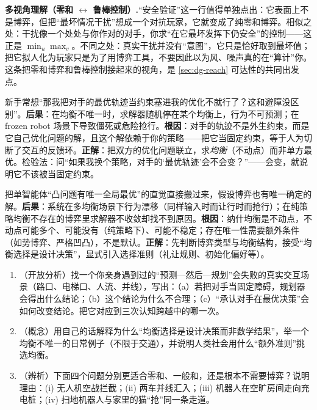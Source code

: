 \begin{note}
\textbf{多视角理解（零和 $\leftrightarrow$ 鲁棒控制）.}\;“安全验证”这一行值得单独点出：它表面上不是博弈，但把“最坏情况干扰”想成一个对抗玩家，它就变成了纯零和博弈。相似之处：干扰像一个处处与你作对的对手，你求“在它最坏发挥下仍安全”的控制——这正是 $\min_u\max_v$。不同之处：真实干扰并没有“意图”，它只是恰好取到最坏值；把它拟人化为玩家只是为了用博弈工具，不要因此以为风、噪声真的在“算计”你。这条把零和博弈和鲁棒控制接起来的视角，是 \cref{sec:dg-reach} 可达性的共同出发点。
\end{note}

\begin{pitfall}
新手常想“那我把对手的最优轨迹当约束塞进我的优化不就行了？这和避障没区别”。\textbf{后果}：在均衡不唯一时，求解器随机停在某个均衡上，行为不可预测；在 frozen robot 场景下导致僵死或危险抢行。\textbf{根因}：对手的轨迹不是外生约束，而是它自己优化问题的解，且这个解依赖于你的策略——把它当固定约束，等于人为切断了交互的反馈环。\textbf{正解}：把双方的优化问题联立，求\emph{均衡}（不动点）而非单方最优。检验法：问“如果我换个策略，对手的‘最优轨迹’会不会变？”——会变，就说明它不该被当固定约束。
\end{pitfall}

\begin{pitfall}
把单智能体“凸问题有唯一全局最优”的直觉直接搬过来，假设博弈也有唯一确定的解。\textbf{后果}：系统在多均衡场景下行为漂移（同样输入时而让行时而抢行）；在纯策略均衡不存在的博弈里求解器不收敛却找不到原因。\textbf{根因}：纳什均衡是不动点，不动点可能多个、可能没有（纯策略下）、可能不稳定；存在唯一性需要额外条件（如势博弈、严格凹凸），不是默认。\textbf{正解}：先判断博弈类型与均衡结构，接受“均衡选择是设计决策”，显式引入选择准则（礼让规则、初始化偏好等）。
\end{pitfall}

\begin{practice}
\begin{enumerate}
  \item （开放分析）找一个你亲身遇到过的“预测—然后—规划”会失败的真实交互场景（路口、电梯口、人流、并线），写出：（a）若把对手当固定障碍，规划器会得出什么结论；（b）这个结论为什么不合理；（c）“承认对手在最优决策”会如何改变结论。把它对应到三次认知跨越中的哪一次。
  \item （概念）用自己的话解释为什么“均衡选择是设计决策而非数学结果”，举一个均衡不唯一的日常例子（不限于交通），并说明人类社会用什么“额外准则”挑选均衡。
  \item （辨析）下面四个问题分别更适合零和、一般和，还是根本不需要博弈？说明理由：(i) 无人机空战拦截；(ii) 两车并线汇入；(iii) 机器人在空旷房间走向充电桩；(iv) 扫地机器人与家里的猫“抢”同一条走道。
\end{enumerate}
\end{practice}

